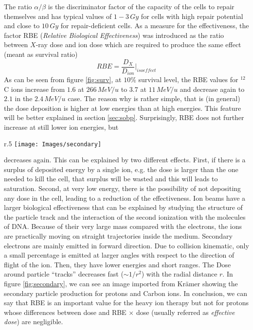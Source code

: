 \documentclass[12pt, a4paper, twoside]{book}
\begin{document}
The ratio $\alpha/\beta$ is the discriminator factor of the capacity of the cells to repair themselves and has typical values of $1-3\, Gy$ for cells with high repair potential and close to $10\, Gy$ for repair-deficient cells.
As a measure for the effectiveness, the factor RBE (\emph{Relative Biological Effectiveness}) was introduced as the ratio between $X$-ray dose and ion dose which are required to produce the same effect (meant as survival ratio)
\[
RBE = \frac{D_X}{D_{ion}}\Bigg|_{isoeffect}
\]
As can be seen from figure \ref{fig:surv}, at $10\%$ survival level, the RBE values for $^{12}$C ions increase from $1.6$ at $266\,MeV/u$ to $3.7$ at $11\,MeV/u$ and decrease again to $2.1$ in the $2.4\,MeV/u$ case. The reason why is rather simple, that is (in general) the dose deposition is higher at low energies than at high energies. This feature will be better explained in section \ref{sec:sobp}.
\newpage
Surprisingly, RBE does not further increase at still lower ion energies, but 
\begin{wrapfigure}{r}{.5\textwidth}
\centering
{\texttt{[image: Images/secondary]}}
\caption{Monte-Carlo simulations showing individual tracks of $\delta$-electrons produced by energetic protons and $^{12}C$ ions penetrating the tissue. From Kr\"amer \cite{Kram:track}}
\label{fig:secondary}
\end{wrapfigure}
\noindent decreases again. This can be explained by two different effects. First, if there is a surplus of deposited energy by a single ion, e.g. the dose is larger than the one needed to kill the cell, that surplus will be wasted and this will leads to saturation. Second, at very low energy, there is the possibility of not depositing any dose in the cell, leading to a reduction of the effectiveness.
Ion beams have a larger biological effectiveness that can be explained by studying the structure of the particle track and the interaction of the second ionization with the molecules of DNA. 
Because of their very large mass compared with the electrons, the ions are practically moving on straight trajectories inside the medium.
Secondary electrons are mainly emitted in forward direction.
Due to collision kinematic, only a small percentage is emitted at larger angles with respect to the direction of flight of the ion. Then, they have lower energies and short ranges. The Dose around particle ``tracks'' decreases fast ($\sim1/r^2$) with the radial distance $r$. In figure \ref{fig:secondary}, we can see an image imported from Kr\"amer \cite{Kram:track} showing the secondary particle production for protons and Carbon ions.
In conclusion, we can say that RBE is an important value for the heavy ion therapy but not for protons whose differences between dose and RBE $\times$ dose (usually referred as \emph{effective dose}) are negligible.
\end{document}
